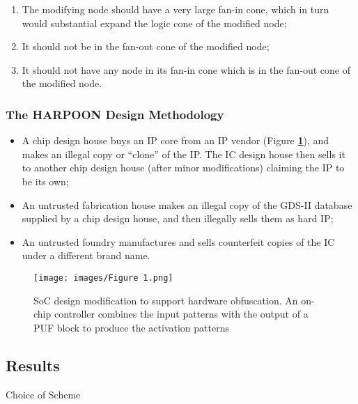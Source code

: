 \documentclass{optica-article}
\begin{document}
\begin{enumerate}
    \item The modifying node should have a very large fan-in cone, which in turn would substantial expand the logic cone of the modified node;
    \item It should not be in the fan-out cone of the modified node;
    \item It should not have any node in its fan-in cone which is in the fan-out cone of the modified node.
\end{enumerate}



\subsubsection{The HARPOON Design Methodology}

\begin{itemize}
    \item A chip design house buys an IP core from an IP vendor (Figure \textbf{\ref{fig:Figure 1}}), and makes an illegal copy or “clone” of the IP. The IC design house then sells it to another chip design house (after minor modifications) claiming the IP to be its own;
    \item An untrusted fabrication house makes an illegal copy of the GDS-II database supplied by a chip design house, and then illegally sells them as hard IP;
    \item An untrusted foundry manufactures and sells counterfeit copies of the IC under a different brand name.
\end{itemize}

\begin{figure}[H]
    \centering
    \texttt{[image: images/Figure 1.png]}
    \caption{SoC design modification to support hardware obfuscation. An on-chip controller combines the input patterns with the output of a PUF block to produce the activation patterns}
    \label{fig:Figure 1}
\end{figure}



\subsection{Results}

Choice of Scheme \\
\end{document}
